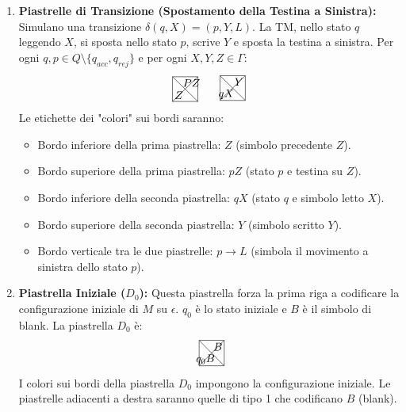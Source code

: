 \documentclass[a4paper]{article}
\theoremstyle{definition} %
\begin{document}
\begin{enumerate}
    \item \textbf{Piastrelle di Transizione (Spostamento della Testina a Sinistra):}
    Simulano una transizione $\delta(q, X) = (p, Y, L)$. La TM, nello stato $q$ leggendo $X$, si sposta nello stato $p$, scrive $Y$ e sposta la testina a sinistra.
    Per ogni $q, p \in Q \setminus \{q_{acc}, q_{rej}\}$ e per ogni $X, Y, Z \in \Gamma$:
    \[
    \begin{tikzpicture}[scale=0.8]
    \draw (0,0) -- (1,0) -- (1,1) -- (0,1) -- cycle;
    \draw (0,0) -- (1,1);
    \draw (1,0) -- (0,1);
    \node at (0.25, 0.75) {}; %
    \node at (0.75, 0.75) {$PZ$}; %
    \node at (0.25, 0.25) {$Z$}; %
    \node at (0.75, 0.25) {}; %
    \end{tikzpicture}
    \quad
    \begin{tikzpicture}[scale=0.8]
    \draw (0,0) -- (1,0) -- (1,1) -- (0,1) -- cycle;
    \draw (0,0) -- (1,1);
    \draw (1,0) -- (0,1);
    \node at (0.25, 0.75) {}; %
    \node at (0.75, 0.75) {$Y$}; %
    \node at (0.25, 0.25) {$qX$}; %
    \node at (0.75, 0.25) {}; %
    \end{tikzpicture}
    \]
    Le etichette dei "colori" sui bordi saranno:
    \begin{itemize}
        \item Bordo inferiore della prima piastrella: $Z$ (simbolo precedente $Z$).
        \item Bordo superiore della prima piastrella: $pZ$ (stato $p$ e testina su $Z$).
        \item Bordo inferiore della seconda piastrella: $qX$ (stato $q$ e simbolo letto $X$).
        \item Bordo superiore della seconda piastrella: $Y$ (simbolo scritto $Y$).
        \item Bordo verticale tra le due piastrelle: $p \to L$ (simbola il movimento a sinistra dello stato $p$).
    \end{itemize}

    \item \textbf{Piastrella Iniziale ($D_0$):}
    Questa piastrella forza la prima riga a codificare la configurazione iniziale di $M$ su $\epsilon$. $q_0$ è lo stato iniziale e $B$ è il simbolo di blank.
    La piastrella $D_0$ è:
    \[
    \begin{tikzpicture}[scale=0.8]
    \draw (0,0) -- (1,0) -- (1,1) -- (0,1) -- cycle;
    \draw (0,0) -- (1,1);
    \draw (1,0) -- (0,1);
    \node at (0.25, 0.75) {}; %
    \node at (0.75, 0.75) {$B$}; %
    \node at (0.25, 0.25) {$q_0B$}; %
    \node at (0.75, 0.25) {}; %
    \end{tikzpicture}
    \]
    I colori sui bordi della piastrella $D_0$ impongono la configurazione iniziale. Le piastrelle adiacenti a destra saranno quelle di tipo 1 che codificano $B$ (blank).
\end{enumerate}
\end{document}
